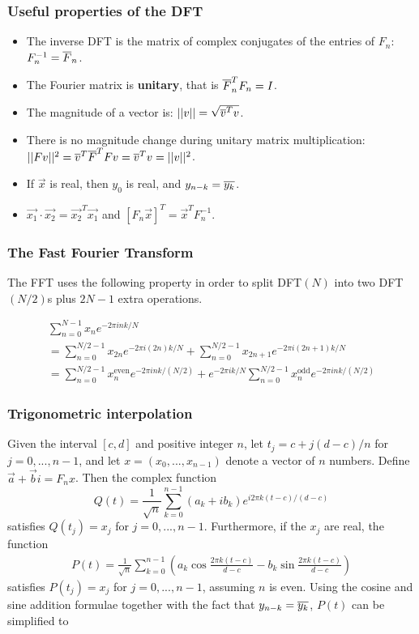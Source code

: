 \subsubsection{Useful properties of the DFT}
\begin{itemize}
    \item The inverse DFT is the matrix of complex conjugates of the entries of $F_n$: $F_n^{-1} = \overline{F}_n$.
    \item The Fourier matrix is \textbf{unitary}, that is $\overline{F}_n^T F_n = I$.
    \item The magnitude of a vector is: $||v|| = \sqrt{\overline{v}^T v}$.
    \item There is no magnitude change during unitary matrix multiplication: $||Fv||^2 = \overline{v}^T\overline{F}^T F v = \overline{v}^T v = ||v||^2$.
    \item If $\vec{x}$ is real, then $y_0$ is real, and $y_{n-k} = \overline{y_k}$.
    \item $\vec{x_1} \cdot \vec{x_2} = \vec{x_2}^T \vec{x_1}$ and $[F_n \vec{x}]^T = \vec{x}^TF_n^{-1}$.
\end{itemize}

\subsubsection{The Fast Fourier Transform}
The FFT uses the following property in order to split DFT$(N)$ into two DFT$(N/2)$s plus $2N-1$ extra operations.

\begin{gather*}
 \sum_{n=0}^{N-1}x_n e^{-2 \pi i n k / N} \\
= \sum_{n=0}^{N/2-1} x_{2n}e^{-2 \pi i(2n)k/N} + \sum_{n=0}^{N/2-1} x_{2n+1}e^{-2 \pi i(2n+1)k/N} \\
= \sum_{n=0}^{N/2-1} x_n^{\text{even}}e^{-2 \pi i n k /(N/2)} + e^{-2 \pi i k / N} \sum_{n=0}^{N/2-1} x_n^{\text{odd}}e^{-2 \pi i n k /(N/2)}
\end{gather*}

\subsubsection{Trigonometric interpolation}
Given the interval $[c,d]$ and positive integer $n$, let $t_j = c + j(d-c)/n$ for $j = 0,...,n-1$, and let $x=(x_0,...,x_{n-1})$ denote a vector of $n$ numbers. Define $\vec{a} + \vec{b}i = F_n x$. Then the complex function
$$
Q(t) = \frac{1}{\sqrt{n}} \sum_{k=0}^{n-1} (a_k + i b_k) e^{i 2\pi k (t-c)/(d-c)}
$$
satisfies $Q(t_j) = x_j$ for $j= 0,...,n-1$. Furthermore, if the $x_j$ are real, the function
\begin{gather*}
P(t) = \frac{1}{\sqrt{n}} \sum_{k=0}^{n-1} \left( a_k \cos{\frac{2 \pi k (t-c)}{d-c}} - b_k \sin{\frac{2 \pi k (t-c)}{d-c}} \right)
\end{gather*}
satisfies $P(t_j) = x_j$ for $j = 0,...,n-1$, assuming $n$ is even. Using the cosine and sine addition formulae together with the fact that $y_{n-k} = \overline{y_k}$, $P(t)$ can be simplified to

